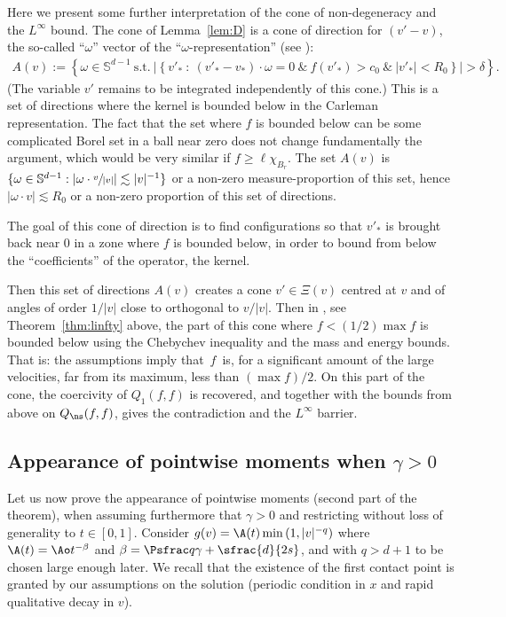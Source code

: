 \begin{remark} Here we present some further interpretation of the cone
of non-degeneracy and the $L^\infty$ bound. The cone of
Lemma~\ref{lem:D} is a cone of direction for $(v'-v)$, \ie the
so-called ``$\omega$'' vector of the ``$\omega$-representation''
(see \cite[\S 4.6]{villani-book}):
\begin{align*}
A(v) :=
\left\{ \omega \in \mathbb S^{d-1} \
\mbox{s.t.} \ \left| \left\{ v'_* \ : \ (v'_*-v_*)
\cdot \omega =0 \ \& \ f(v'_*) > c_0 \ \& \ |v'_*| < R_0 \right\}
\right| > \delta \right\}.
\end{align*}
(The variable $v'$ remains to be integrated independently of this
cone.) This is a set of directions where the kernel is bounded below
in the Carleman representation. The fact that the set where $f$ is
bounded below can be some complicated Borel set in a ball near zero
does not change fundamentally the argument, which would be very
similar if $f \ge \ell \chi_{B_r}$. The set $A(v)$ is
$\{ \omega \in \mathbb S^{d-1}: |\omega \cdot \sfrac{v}{|v|}| \lesssim |v|^{-1}\}$ or a non-zero
measure-proportion of this set, hence $|\omega \cdot v| \lesssim R_0$
or a non-zero proportion of this set of directions.

The goal of this cone of direction is to find configurations so
that $v'_*$ is brought back near $0$ in a zone where $f$ is bounded
below, in order to bound from below the ``coefficients'' of the
operator, \ie the kernel.

Then this set of directions $A(v)$ creates a cone $v' \in \Xi(v)$
centred at $v$ and of angles of order $1/|v|$ close to orthogonal to
$v/|v|$. Then in \cite{luis}, see Theorem~\ref{thm:linfty} above,
the part of this cone where $f < (1/2) \max f$ is bounded below using
the Chebychev inequality and the mass and energy bounds. That is: the
assumptions imply that~$f$~is, for a significant amount of the large
velocities, far from its maximum, \ie less than $(\max f)/2$. On this
part of the cone, the coercivity of $Q_1(f,f)$ is recovered, and together
with the bounds from above on $Q_{\ns}(f,f)$, gives the contradiction and the
$L^\infty$ barrier.
\end{remark}

\subsection{Appearance of pointwise moments when $\gamma>0$}
\label{s:appearance-hard}

Let us now prove the appearance of pointwise moments (second part of
the theorem), when assuming furthermore that $\gamma >0$ and
restricting without loss of generality to $t \in [0,1]$. Consider
$g(v) = \A(t) \min\left(1,|v|^{-q} \right)$ where
$\A(t) = \Ao t^{-\beta}$ and $\beta = \Psfrac q \gamma + \sfrac{d}{2s}$,
and with $q >d+1$ to be chosen large enough later. We recall that the
existence of the first contact point is granted by our assumptions on
the solution (periodic condition in $x$ and rapid qualitative decay in
$v$).

